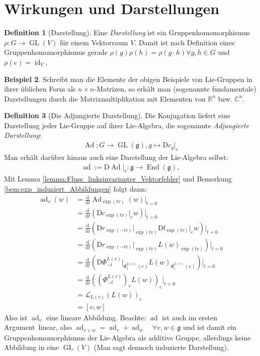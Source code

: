 \documentclass[a4paper]{scrbook}
\numberwithin{equation}{chapter}
\newcommand{\D}{\mathrm{d}}
\newcommand{\DD}{\mathrm{D}}
\DeclareMathOperator{\id}{id}
\DeclareMathOperator{\GL}{GL}
\DeclareMathOperator{\End}{End}
\DeclareMathOperator{\Ad}{Ad}
\DeclareMathOperator{\ad}{ad}
\newcommand{\R}{\mathbb{R}}
\theoremstyle{definition}
\newtheorem{defn}{Definition}[section]
\newtheorem{bsp}[defn]{Beispiel}
\begin{document}
	\section{Wirkungen und Darstellungen}
		\begin{defn}[Darstellung]
			Eine \emph{Darstellung} ist ein Gruppenhomomorphismus $\rho\colon G\rightarrow \GL(V)$ für einem Vektorraum $V$. Damit ist nach Definition eines Gruppenhomomorphismus gerade $\rho(g)\rho(h)=\rho(g\cdot h) \forall g,h\in G$ und $\rho(e)=\id_V$.
		\end{defn}
		\begin{bsp}
			Schreibt man die Elemente der obigen Beispiele von Lie-Gruppen in ihrer üblichen Form als $n\times n$-Matrizen, so erhält man (sogenannte fundamentale) Darstellungen durch die Matrixmultiplikation mit Elementen von $\R^n$ bzw. $\mathbb{C}^n$.
		\end{bsp}
		\begin{defn}[Die Adjungierte Darstellung]\hfill
			
			Die Konjugation liefert eine Darstellung jeder Lie-Gruppe auf ihrer Lie-Algebra, die sogenannte \emph{Adjungierte Darstellung}:
			\begin{align*}
				\Ad\colon G\rightarrow \GL(\mathfrak{g}), g\mapsto \DD c_g\vert_e
			\end{align*}
			Man erhält darüber hinaus auch eine Darstellung der Lie-Algebra selbst:
			\begin{align*}
				\ad:=\DD\Ad\vert_e\colon\mathfrak{g}\rightarrow\End(\mathfrak{g}),
			\end{align*}
			Mit Lemma \ref{lemma:Fluss_linksinvarianter_Vektorfelder} und Bemerkung \ref{bem:exp_induziert_Abbildungen} folgt dann:
			\begin{align*}
				\ad_v(w)&=\frac{\D}{\D t} \Ad_{\exp(tv)}(w)\Big\vert_{t=0}\\
				&=\frac{\D}{\D t} \left(\DD c_{\exp(tv)}\vert_e w\right)\Big\vert_{t=0}\\
				&=\frac{\D}{\D t} \left(\DD r_{\exp(-tv)}\vert_{\exp(tv)}\DD l_{\exp(tv)}\vert_e w\right)\Big\vert_{t=0}\\
				&=\frac{\D}{\D t} \left(\DD r_{\exp(-tv)}\vert_{\exp(tv)}L(w)_{\exp(tv)}\right)\Big\vert_{t=0}\\
				&=\frac{\D}{\D t} \left(\DD \Phi_{-t}^{L(v)}\vert_{\Phi^{L(v)}_t(e)}L(w)_{\Phi^{L(v)}_t(e)}\right)\Big\vert_{t=0}\\
				&=\frac{\D}{\D t} \left(\left(\Phi_{-t}^{L(v)}\right)_*L(w)\right)_e\Big\vert_{t=0}\\
				&=\mathcal{L}_{L(v)}(L(w))_e\\
				&=\left[v,w\right]
			\end{align*}
			Also ist $\ad_v$ eine lineare Abbildung. Beachte: $\ad$ ist auch \glqq im ersten Argument\grqq\ linear, also $\ad_{v+w}=\ad_v+\ad_w \quad\forall v,w\in\mathfrak{g}$ und ist damit ein Gruppenhomomorphismus der Lie-Algebra als additive Gruppe, allerdings keine Abbildung in eine $\GL(V)$ (Man sagt dennoch \glqq induzierte Darstellung\grqq).
		\end{defn}
\end{document}
